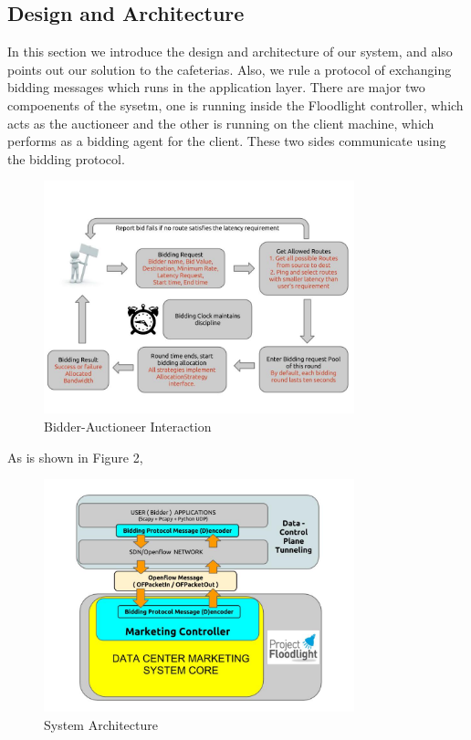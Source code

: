 \documentclass[a4paper,11pt,twocolumn]{article}
\begin{document}
\subsection{Design and Architecture}
In this section we introduce the design and architecture of our system, and also points out our solution to the cafeterias. Also, 
we rule a protocol of exchanging bidding messages which runs in the application layer. There are major two compoenents of the sysetm,
one is running inside the Floodlight controller, which acts as the auctioneer and the other is running on the client machine, 
which performs as a bidding agent for the client. These two sides communicate using the bidding protocol. 

\begin{figure}[ht!]
\centering
\includegraphics[width=90mm]{flow.jpg}
\caption{Bidder-Auctioneer Interaction}
\label{overflow}
\end{figure}
As is shown in Figure 2, 

\begin{figure}[ht!]
\centering
\includegraphics[width=90mm]{architecture_controller.jpg}
\caption{System Architecture}
\label{overflow}
\end{figure}
\end{document}
